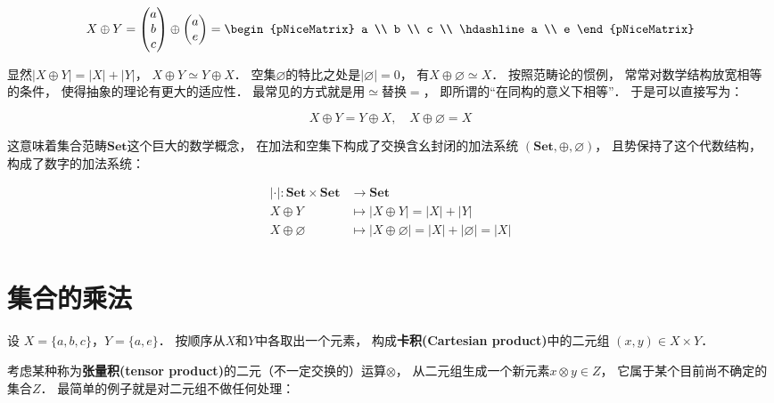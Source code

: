 \documentclass[10pt, openany]{book}
\begin{document}
\begin{equation}
X \oplus Y 
=\begin{pmatrix} a \\ b \\ c \end{pmatrix}
\oplus \begin{pmatrix} a \\ e \end{pmatrix}
= \begin{pNiceMatrix}
    a \\ b \\ c \\ \hdashline
    a \\ e 
\end{pNiceMatrix}
\end{equation}

显然$|X \oplus Y| = |X| + |Y|$，
$X \oplus Y \simeq Y \oplus X$．
空集$\varnothing$的特比之处是$|\varnothing| = 0$，
有$X \oplus \varnothing \simeq X$．
按照范畴论的惯例，
常常对数学结构放宽相等的条件，
使得抽象的理论有更大的适应性．
最常见的方式就是用$\simeq$替换$=$，
即所谓的“在同构的意义下相等”．
于是可以直接写为：

$$X \oplus Y = Y \oplus X, \quad 
X \oplus \varnothing = X$$

这意味着集合范畴$\mathbf{Set}$这个巨大的数学概念，
在加法和空集下构成了交换含幺封闭的加法系统
$(\mathbf{Set},\oplus,\varnothing)$，
且势保持了这个代数结构，
构成了数字的加法系统：

$$
\begin{aligned}
|\cdot|: \mathbf{Set} \times \mathbf{Set} &\to \mathbf{Set} \\
X \oplus Y &\mapsto |X \oplus Y| = |X| + |Y| \\
X \oplus \varnothing &\mapsto |X \oplus \varnothing| = |X| + |\varnothing| = |X| \\
\end{aligned}
$$

\section{集合的乘法}

设 $X = \{a, b, c\}$，$Y = \{a,e\}$．
按顺序从$X$和$Y$中各取出一个元素，
构成\textbf{卡积(Cartesian product)}中的二元组
$(x,y) \in X \times Y$．

考虑某种称为\textbf{张量积(tensor product)}的二元（不一定交换的）运算$\otimes$，
从二元组生成一个新元素$x \otimes y\in Z$，
它属于某个目前尚不确定的集合$Z$．
最简单的例子就是对二元组不做任何处理：
\end{document}
